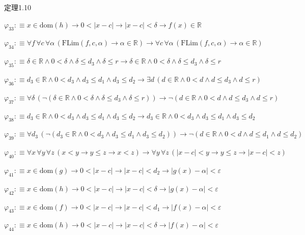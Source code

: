 \begin{fullproof}{定理1.10}
\begin{abbrevlist}
\item $\varphi_{33} :\equiv x \in \mathrm{dom}(h) \to 0 < \lvert x - c \rvert \to \lvert x - c \rvert < \delta \to f(x) \in \mathbb{R}$
\item $\varphi_{34} :\equiv \forall f\,\forall c\,\forall \alpha\,(\mathrm{FLim}(f,c,\alpha) \to \alpha \in \mathbb{R}) \to \forall c\,\forall \alpha\,(\mathrm{FLim}(f,c,\alpha) \to \alpha \in \mathbb{R})$
\item $\varphi_{35} :\equiv \delta \in \mathbb{R} \land 0 < \delta \land \delta \leq d_{3} \land \delta \leq r \to \delta \in \mathbb{R} \land 0 < \delta \land \delta \leq d_{3} \land \delta \leq r$
\item $\varphi_{36} :\equiv d_{3} \in \mathbb{R} \land 0 < d_{3} \land d_{3} \leq d_{1} \land d_{3} \leq d_{2} \to \exists d\,(d \in \mathbb{R} \land 0 < d \land d \leq d_{3} \land d \leq r)$
\item $\varphi_{37} :\equiv \forall \delta\,(\neg (\delta \in \mathbb{R} \land 0 < \delta \land \delta \leq d_{3} \land \delta \leq r)) \to \neg (d \in \mathbb{R} \land 0 < d \land d \leq d_{3} \land d \leq r)$
\item $\varphi_{38} :\equiv d_{3} \in \mathbb{R} \land 0 < d_{3} \land d_{3} \leq d_{1} \land d_{3} \leq d_{2} \to d_{3} \in \mathbb{R} \land 0 < d_{3} \land d_{3} \leq d_{1} \land d_{3} \leq d_{2}$
\item $\varphi_{39} :\equiv \forall d_{3}\,(\neg (d_{3} \in \mathbb{R} \land 0 < d_{3} \land d_{3} \leq d_{1} \land d_{3} \leq d_{2})) \to \neg (d \in \mathbb{R} \land 0 < d \land d \leq d_{1} \land d \leq d_{2})$
\item $\varphi_{40} :\equiv \forall x\,\forall y\,\forall z\,(x < y \to y \leq z \to x < z) \to \forall y\,\forall z\,(\lvert x - c \rvert < y \to y \leq z \to \lvert x - c \rvert < z)$
\item $\varphi_{41} :\equiv x \in \mathrm{dom}(g) \to 0 < \lvert x - c \rvert \to \lvert x - c \rvert < d_{2} \to \lvert g(x) - \alpha \rvert < \varepsilon$
\item $\varphi_{42} :\equiv x \in \mathrm{dom}(h) \to 0 < \lvert x - c \rvert \to \lvert x - c \rvert < \delta \to \lvert g(x) - \alpha \rvert < \varepsilon$
\item $\varphi_{43} :\equiv x \in \mathrm{dom}(f) \to 0 < \lvert x - c \rvert \to \lvert x - c \rvert < d_{1} \to \lvert f(x) - \alpha \rvert < \varepsilon$
\item $\varphi_{44} :\equiv x \in \mathrm{dom}(h) \to 0 < \lvert x - c \rvert \to \lvert x - c \rvert < \delta \to \lvert f(x) - \alpha \rvert < \varepsilon$

\end{abbrevlist}
\end{fullproof}
